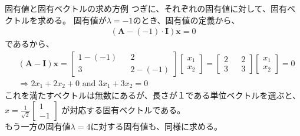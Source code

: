 \documentclass[dvipdfmx,autodetect-engine, unicode, 10pt, aspectratio=169]{beamer}
\begin{document}
\begin{frame}{固有値と固有ベクトルの求め方例}
    つぎに、それぞれの固有値に対して、固有ベクトルを求める。
    固有値が$\lambda = -1$のとき、固有値の定義から、
    \begin{align*}
        (\bm{A} - (-1)\cdot \bm{I} )\bm{x} = 0
    \end{align*}
    であるから、
    \begin{align*}
        &(\bm{A} - \bm{I})\bm{x} = 
            \begin{bmatrix}
                1-(-1) && 2 \\
                3 && 2 - (-1)
            \end{bmatrix}
            \begin{bmatrix}
                x_1 \\ x_2
            \end{bmatrix} = 
            \begin{bmatrix}
                2 && 2 \\
                3 && 3
            \end{bmatrix}
            \begin{bmatrix}
                x_1 \\ x_2
            \end{bmatrix} = 0 \\
            &\Rightarrow 2x_1 + 2x_2 +0 \text{ and } 3x_1 + 3x_2 = 0
    \end{align*}
    これを満たすベクトルは無数にあるが、長さが１である単位ベクトルを選ぶと、\\
    $x = \frac{1}{\sqrt{2}}\begin{bmatrix}
        1 \\ -1
    \end{bmatrix}$
    が対応する固有ベクトルである。\\もう一方の固有値$\lambda =4$に対する固有値も、同様に求める。
    
\end{frame}
\end{document}
